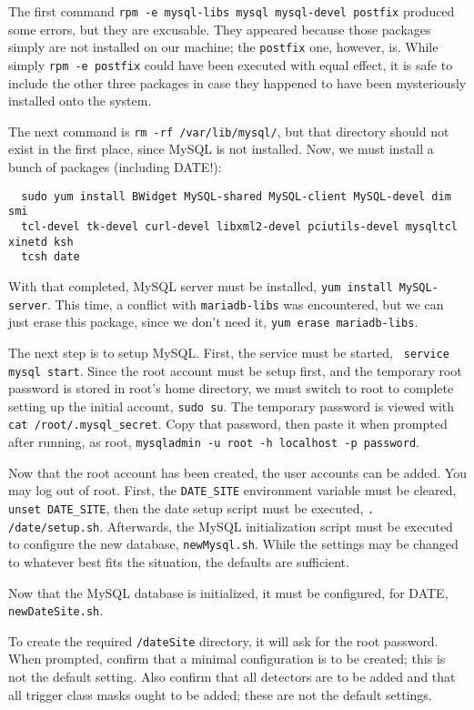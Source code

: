 \documentclass[12pt]{article}
\begin{document}
\qq The first command {\tt rpm -e mysql-libs mysql mysql-devel
  postfix} produced some errors, but they are excusable. They appeared because
those packages simply are not installed on our machine; the {\tt postfix} one,
however, is. While simply {\tt rpm -e postfix} could have been executed with
equal effect, it is safe to include the other three packages in case they
happened to have been mysteriously installed onto the system. 

\qq The next command is {\tt rm -rf /var/lib/mysql/}, but that directory should
not exist in the first place, since MySQL is not installed. Now, we must install
a bunch of packages (including DATE!): 

\begin{verbatim}
  sudo yum install BWidget MySQL-shared MySQL-client MySQL-devel dim smi
  tcl-devel tk-devel curl-devel libxml2-devel pciutils-devel mysqltcl xinetd ksh
  tcsh date
\end{verbatim}

With that completed, MySQL server must be installed, {\tt yum install
  MySQL-server}. This time, a conflict with {\tt mariadb-libs} was encountered,
but we can just erase this package, since we don't need it, {\tt yum erase
  mariadb-libs}.



\qq The next step is to setup MySQL. First, the service must be started, {\tt
  service mysql start}. Since the root account must be setup first, and the
temporary root password is stored in root's home directory, we must switch to
root to complete setting up the initial account, {\tt sudo su}. The temporary
password is viewed with {\tt cat /root/.mysql\_secret}. Copy that password, then
paste it when prompted after running, as root, {\tt mysqladmin -u root -h
  localhost -p password}. 

\qq Now that the root account has been created, the user accounts can be
added. You may log out of root. First, the {\tt DATE\_SITE} environment variable
must be cleared, {\tt unset DATE\_SITE}, then the date setup script must be
executed, {\tt . /date/setup.sh}. Afterwards, the MySQL initialization script
must be executed to configure the new database, {\tt newMysql.sh}. While the
settings may be changed to whatever best fits the situation, the defaults are
sufficient.

\qq Now that the MySQL database is initialized, it must be configured, for DATE,
{\tt newDateSite.sh}. 

\begin{tcolorbox}[title=NOTE, colback=white, colframe=blue]
  To create the required {\tt /dateSite} directory, it
  will ask for the root password. When prompted, confirm that a minimal
  configuration is to be created; this is not the default setting. Also confirm
  that all detectors are to be added and that all trigger class masks ought to be
  added; these are not the default settings.
\end{tcolorbox}
\end{document}
